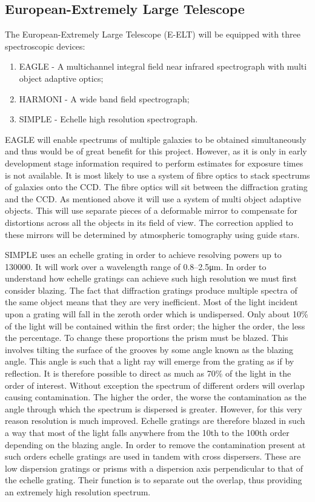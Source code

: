 		\subsection{European-Extremely Large Telescope} %
		\label{sub:european_extremely_large_telescope}
			The European-Extremely Large Telescope (E-ELT) will be equipped with three spectroscopic devices:
			\begin{enumerate}
				\item EAGLE - A multichannel integral field near infrared spectrograph with multi object adaptive optics;
				\item HARMONI - A wide band field spectrograph;
				\item SIMPLE - Echelle high resolution spectrograph.
			\end{enumerate}
			EAGLE will enable spectrums of multiple galaxies to be obtained simultaneously and thus would be of great benefit for this project. However, as it is only in early development stage information required to perform estimates for exposure times is not available. It is most likely to use a system of fibre optics to stack spectrums of galaxies onto the CCD. The fibre optics will sit between the diffraction grating and the CCD. As mentioned above it will use a system of multi object adaptive objects. This will use separate pieces of a deformable mirror to compensate for distortions across all the objects in its field of view. The correction applied to these mirrors will be determined by atmospheric tomography using guide stars\cite{MultiObjectAOptics}.

			SIMPLE uses an echelle grating in order to achieve resolving powers up to \num{130000}. It will work over a wavelength range of 0.8--2.5\si{\micro\metre}. In order to understand how echelle gratings can achieve such high resolution we must first consider blazing. The fact that diffraction gratings produce multiple spectra of the same object means that they are very inefficient. Most of the light incident upon a grating will fall in the zeroth order which is undispersed. Only about 10\% of the light will be contained within the first order; the higher the order, the less the percentage. To change these proportions the prism must be blazed. This involves tilting the surface of the grooves by some angle known as the blazing angle. This angle is such that a light ray will emerge from the grating as if by reflection. It is therefore possible to direct as much as 70\% of the light in the order of interest. Without exception the spectrum of different orders will overlap causing contamination. The higher the order, the worse the contamination as the angle through which the spectrum is dispersed is greater. However, for this very reason resolution is much improved. Echelle gratings are therefore blazed in such a way that most of the light falls anywhere from the 10th to the 100th order depending on the blazing angle. In order to remove the contamination present at such orders echelle gratings are used in tandem with cross dispersers. These are low dispersion gratings or prisms with a dispersion axis perpendicular to that of the echelle grating. Their function is to separate out the overlap, thus providing an extremely high resolution spectrum\cite{SIMPLEechelle}\cite{Echelleprinc}.

